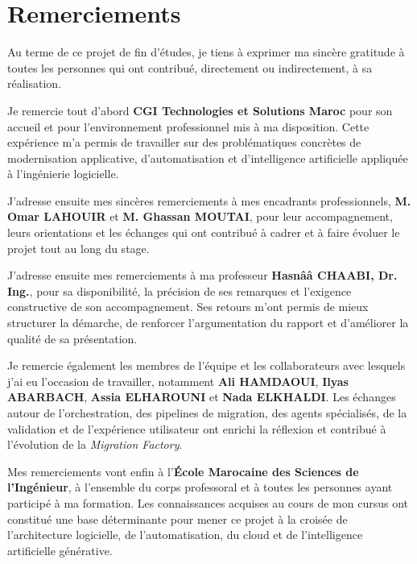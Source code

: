 \chapter*{Remerciements}

Au terme de ce projet de fin d'études, je tiens à exprimer ma sincère gratitude à toutes les personnes qui ont contribué, directement ou indirectement, à sa réalisation.

Je remercie tout d'abord \textbf{CGI Technologies et Solutions Maroc} pour son accueil et pour l'environnement professionnel mis à ma disposition. Cette expérience m'a permis de travailler sur des problématiques concrètes de modernisation applicative, d'automatisation et d'intelligence artificielle appliquée à l'ingénierie logicielle.

J'adresse ensuite mes sincères remerciements à mes encadrants professionnels, \textbf{M. Omar LAHOUIR} et \textbf{M. Ghassan MOUTAI}, pour leur accompagnement, leurs orientations et les échanges qui ont contribué à cadrer et à faire évoluer le projet tout au long du stage.

J'adresse ensuite mes remerciements à ma professeur \textbf{Hasnââ CHAABI, Dr. Ing.}, pour sa disponibilité, la précision de ses remarques et l'exigence constructive de son accompagnement. Ses retours m'ont permis de mieux structurer la démarche, de renforcer l'argumentation du rapport et d'améliorer la qualité de sa présentation.

Je remercie également les membres de l'équipe et les collaborateurs avec lesquels j'ai eu l'occasion de travailler, notamment \textbf{Ali HAMDAOUI}, \textbf{Ilyas ABARBACH}, \textbf{Assia ELHAROUNI} et \textbf{Nada ELKHALDI}. Les échanges autour de l'orchestration, des pipelines de migration, des agents spécialisés, de la validation et de l'expérience utilisateur ont enrichi la réflexion et contribué à l'évolution de la \textit{Migration Factory}.

Mes remerciements vont enfin à l'\textbf{École Marocaine des Sciences de l'Ingénieur}, à l'ensemble du corps professoral et à toutes les personnes ayant participé à ma formation. Les connaissances acquises au cours de mon cursus ont constitué une base déterminante pour mener ce projet à la croisée de l'architecture logicielle, de l'automatisation, du cloud et de l'intelligence artificielle générative.
